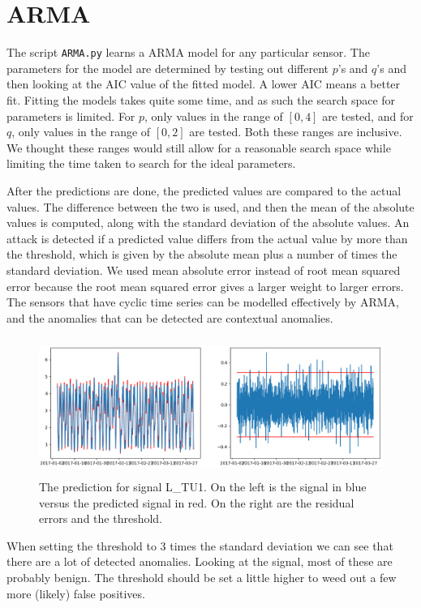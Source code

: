 \documentclass[]{article}
\begin{document}
\clearpage
\section{ARMA}
The script \texttt{ARMA.py} learns a ARMA model for any particular sensor. The parameters for the model are determined by testing out different $p$'s and $q$'s and then looking at the AIC value of the fitted model. A lower AIC means a better fit. Fitting the models takes quite some time, and as such the search space for parameters is limited. For $p$, only values in the range of $[0, 4]$ are tested, and for $q$, only values in the range of $[0, 2]$ are tested. Both these ranges are inclusive. We thought these ranges would still allow for a reasonable search space while limiting the time taken to search for the ideal parameters.

After the predictions are done, the predicted values are compared to the actual values. The difference between the two is used, and then the mean of the absolute values is computed, along with the standard deviation of the absolute values. An attack is detected if a predicted value differs from the actual value by more than the threshold, which is given by the absolute mean plus a number of times the standard deviation. We used mean absolute error instead of root mean squared error because the root mean squared error gives a larger weight to larger errors. The sensors that have cyclic time series can be modelled effectively by ARMA, and the anomalies that can be detected are contextual anomalies.
\begin{center}
\begin{figure}[H]
  \includegraphics[width=16cm, height=4.5cm]{./visuallizations/arma_3stddev_LTU1.png}
  \caption{The prediction for signal L\_TU1. On the left is the signal in blue versus the predicted signal in red. On the right are the residual errors and the threshold.}
  \label{signals}
\end{figure}
\end{center}
When setting the threshold to 3 times the standard deviation we can see that there are a lot of detected anomalies. Looking at the signal, most of these are probably benign. The threshold should be set a little higher to weed out a few more (likely) false positives.
\end{document}
